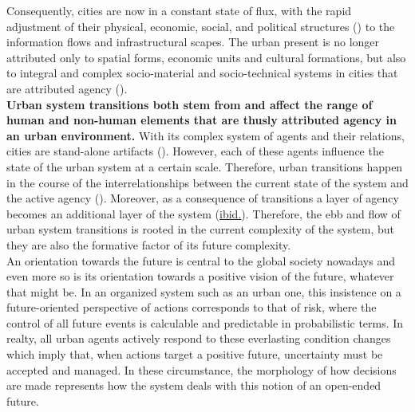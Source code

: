 \documentclass[11pt]{report}
\begin{document}
{{Consequently, cities are now in a constant state of flux, with the rapid adjustment of their physical, economic, social, and political structures (\href{Sykola}{\citealt{sykora_transitional_1999}}) to the information flows and infrastructural scapes.
The urban present is no longer attributed only to spatial forms, economic units and cultural formations, but also to integral and complex socio-material and socio-technical systems in cities that are attributed agency (\href{Farias}{\citealt{farias_introduction:_2011}}). 
\\

\textbf{Urban system transitions both stem from and affect the range of human and non-human elements that are thusly attributed agency in an urban environment.}
With its complex system of agents and their relations, cities are stand-alone artifacts (\href{Portugali}{\citealt{portugali_complexity_2011}}).
However, each of these agents influence the state of the urban system at a certain scale. 
Therefore, urban transitions happen in the course of the interrelationships between the current state of the system and the active agency (\href{Guy}{\citealt{guy_understanding_2000}}).
Moreover, as a consequence of transitions a layer of agency becomes an additional layer of the system (\href{Guy}{ibid.}).
Therefore, the ebb and flow of urban system transitions is rooted in the current complexity of the system, but they are also the formative factor of its future complexity.
\\

An orientation towards the future is central to the global society nowadays and even more so is its orientation towards a positive vision of the future, whatever that might be. In an organized system such as an urban one, this insistence on a future-oriented perspective of actions corresponds to that of risk, where the control of all future events is calculable and predictable in probabilistic terms. In realty, all urban agents actively respond to these everlasting condition changes which imply that, when actions target a positive future, uncertainty must be accepted and managed. In these circumstance, the morphology of how decisions are made represents how the system deals with this notion of an open-ended future. 
\\

}}
\end{document}

